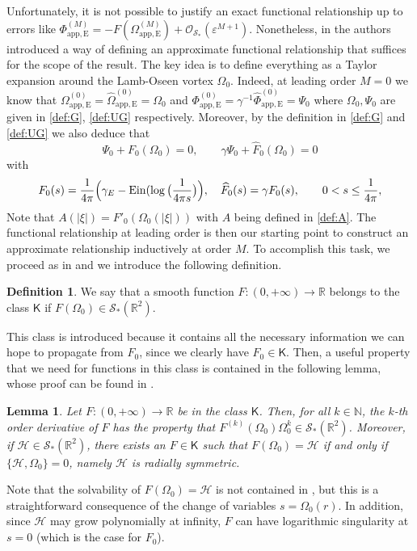 \documentclass[11pt,reqno,a4paper]{amsart}
\def\eps{\varepsilon}
\def\RR {\mathbb{R}}
\def\NN {\mathbb{N}}
\newcommand{\cH}{\mathcal{H}}
\newcommand{\cO}{\mathcal{O}}
\newcommand{\cS}{\mathcal{S}}
\newcommand{\1}{\mathbbm{1}}
\newtheorem{lemma}[proposition]{Lemma}
\theoremstyle{definition}
\newtheorem{definition}[proposition]{Definition}
\theoremstyle{definition}
\numberwithin{equation}{section}
\newcommand{\Mappp}[3]{#1^{(#2)}_\mathrm{app,#3}}
\begin{document}
 Unfortunately, it is not possible to justify an exact functional relationship up to errors like $\Mappp{\Phi}{M}{E}=-F(\Mappp{\Omega}{M}{E})+\cO_{\cS_*}(\eps^{M+1})$. Nonetheless,  in \cite{dolce2024long} the authors introduced  a way of defining an approximate functional relationship that suffices for the scope of the result. The key idea is to define everything as a Taylor expansion around the Lamb-Oseen vortex $\Omega_0$. Indeed, at leading order $M=0$ we know that $\Mappp{\Omega}{0}{E} =\Mappp{\widehat{\Omega}}{0}{E} =\Omega_0$ and $\Mappp{\Phi}{0}{E}=\gamma^{-1}\Mappp{\widehat \Phi}{0}{E}=\Psi_0$ where $\Omega_0,\Psi_0$ are given in \cref{def:G}, \cref{def:UG} respectively. Moreover, by the definition in \cref{def:G} and \cref{def:UG} we also deduce that
\begin{equation}
    \Psi_0+F_0(\Omega_0)=0, \qquad \gamma\Psi_0+\widehat{F}_0(\Omega_0)=0
\end{equation}
with
\begin{equation}
\label{def:F0}
    F_0(s)=\frac{1}{4\pi}\Big(\gamma_E-{\rm Ein}(\log\big(\frac{1}{4\pi s}\big)\Big), \quad \widehat{F}_0(s)=\gamma F_0(s), \qquad 0< s\leq \frac{1}{4\pi},
\end{equation}
Note that $A(|\xi|)=F'_0(\Omega_0(|\xi|))$ with $A$ being defined in \cref{def:A}. The functional relationship at leading order is then our starting point to construct an approximate relationship inductively at order $M$. To accomplish this task, we proceed as in \cite{dolce2024long} and we introduce the following definition.
\begin{definition}
    We say that a smooth function $F:(0,+\infty)\to \RR$ belongs to the  class $\mathsf{K}$ if $F(\Omega_0)\in \cS_*(\RR^2)$.
\end{definition}
This class is introduced because it contains all the necessary information we can hope to propagate from $F_0$, since we clearly have $F_0\in \mathsf{K}$.
Then, a useful property that we need for functions in this class is contained in the following lemma, whose proof can be found in \cite[Lemma 3.19]{dolce2024long}.
\begin{lemma}
\label{lem:FK}
    Let $F:(0,+\infty)\to \RR$ be in the class $\mathsf{K}$. Then, for all $k\in \NN$, the $k$-th order derivative of $F$ has the property that $F^{(k)}(\Omega_0)\Omega_0^k\in\cS_*(\RR^2)$. Moreover, if $\cH\in \cS_{*}(\RR^2)$, there exists an $F\in \mathsf{K}$ such that $F(\Omega_0)=\cH$ if and only if $\{\cH,\Omega_0\}=0$, namely $\cH$ is radially symmetric.
\end{lemma}
Note that the solvability of $F(\Omega_0)=\cH$ is not contained in \cite[Lemma 3.19]{dolce2024long}, but this is a straightforward consequence of the change of variables $s=\Omega_0(r)$. In addition, since $\cH$ may grow polynomially at infinity, $F$ can have logarithmic singularity at $s=0$ (which is the case for $F_0$).
\end{document}
